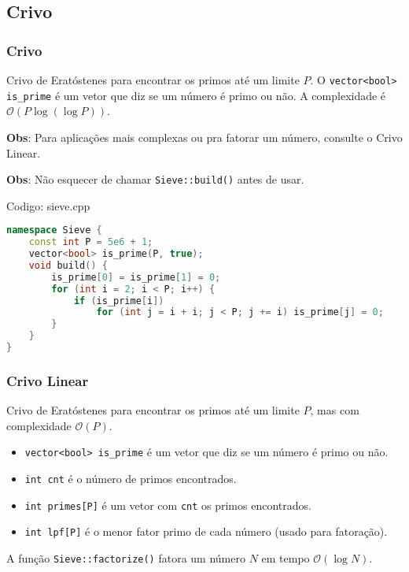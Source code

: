 \documentclass[10pt, a4paper, oneside]{book}
\begin{document}
\subsection{Crivo}
\subsubsection{Crivo}


Crivo de Eratóstenes para encontrar os primos até um limite $P$. O \texttt{vector<bool> is\_prime} é um vetor que diz se um número é primo ou não. A complexidade é $\mathcal{O}(P \log (\log P))$.



\textbf{Obs}: Para aplicações mais complexas ou pra fatorar um número, consulte o Crivo Linear.



\textbf{Obs}: Não esquecer de chamar \texttt{Sieve::build()} antes de usar.
\hfill

Codigo: sieve.cpp

\begin{lstlisting}[language=C++]
namespace Sieve {
    const int P = 5e6 + 1;
    vector<bool> is_prime(P, true);
    void build() {
        is_prime[0] = is_prime[1] = 0;
        for (int i = 2; i < P; i++) {
            if (is_prime[i])
                for (int j = i + i; j < P; j += i) is_prime[j] = 0;
        }
    }
}\end{lstlisting}
\hfill

\subsubsection{Crivo Linear}


Crivo de Eratóstenes para encontrar os primos até um limite $P$, mas com complexidade $\mathcal{O}(P)$.



\begin{itemize}
\item \texttt{vector<bool> is\_prime} é um vetor que diz se um número é primo ou não.
\item \texttt{int cnt} é o número de primos encontrados.
\item \texttt{int primes[P]} é um vetor com \texttt{cnt} os primos encontrados.
\item \texttt{int lpf[P]} é o menor fator primo de cada número (usado para fatoração).
\end{itemize}



A função \texttt{Sieve::factorize()} fatora um número $N$ em tempo $\mathcal{O}(\log N)$.
\end{document}
